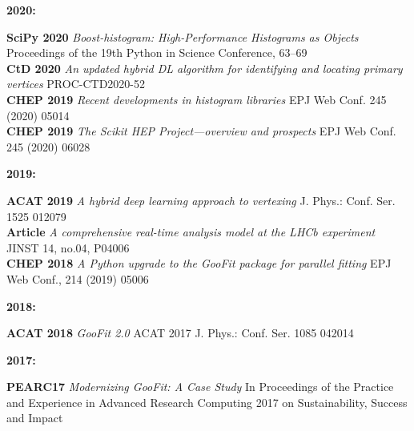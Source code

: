 \documentclass[10pt,letterpaper]{moderncv}
\begin{document}
\begin{minipage}[t]{.06\textwidth}
\textbf{2020:}
\end{minipage}%
\begin{minipage}[t]{.94\textwidth}
\textbf{SciPy 2020} \emph{Boost-histogram: High-Performance Histograms as Objects} Proceedings of the 19th Python in Science Conference, 63--69 \\
\textbf{CtD 2020}   \emph{An updated hybrid DL algorithm for identifying and locating primary vertices} PROC-CTD2020-52 \\
\textbf{CHEP 2019}  \emph{Recent developments in histogram libraries} EPJ Web Conf. 245 (2020) 05014 \\
\textbf{CHEP 2019}  \emph{The Scikit HEP Project---overview and prospects} EPJ Web Conf. 245 (2020) 06028
\end{minipage}

\begin{minipage}[t]{.06\textwidth}
\textbf{2019:}
\end{minipage}%
\begin{minipage}[t]{.94\textwidth}
\textbf{ACAT 2019} \emph{A hybrid deep learning approach to vertexing} J. Phys.: Conf. Ser. 1525 012079 \\
\textbf{Article}   \emph{A comprehensive real-time analysis model at the LHCb experiment} JINST 14, no.04, P04006 \\
\textbf{CHEP 2018} \emph{A Python upgrade to the GooFit package for parallel fitting} EPJ Web Conf., 214 (2019) 05006
\end{minipage}

\begin{minipage}[t]{.06\textwidth}
\textbf{2018:}
\end{minipage}%
\begin{minipage}[t]{.94\textwidth}
\textbf{ACAT 2018} \emph{GooFit 2.0} ACAT 2017 J. Phys.: Conf. Ser. 1085 042014
\end{minipage}

\begin{minipage}[t]{.06\textwidth}
\textbf{2017:}
\end{minipage}%
\begin{minipage}[t]{.94\textwidth}
\textbf{PEARC17} \emph{Modernizing GooFit: A Case Study} In Proceedings of the Practice and Experience in Advanced Research Computing 2017 on Sustainability, Success and Impact
\end{minipage}

\end{document}
